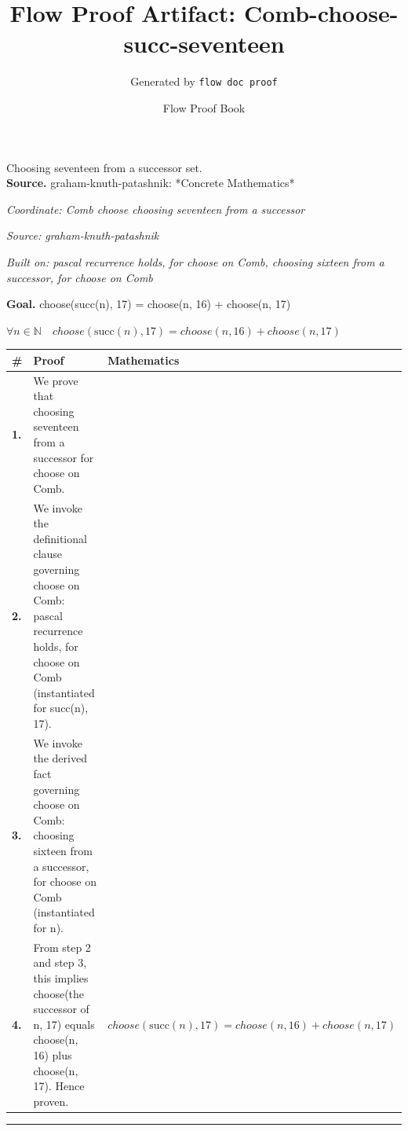\documentclass[11pt]{article}
\title{Flow Proof Artifact: Comb-choose-succ-seventeen}
\author{Generated by \texttt{flow doc proof}}
\date{Flow Proof Book}
\theoremstyle{definition}
\begin{document}
\maketitle
Choosing seventeen from a successor set.\\[0.5em]
\textbf{Source.} graham-knuth-patashnik: *Concrete Mathematics*\\[0.5em]
\bigskip
{}\par
\smallskip\noindent\textit{Coordinate: Comb \cdot choose \cdot choosing seventeen from a successor}\par
\smallskip\noindent\textit{Source: graham-knuth-patashnik}\par
\smallskip\noindent\textit{Built on: pascal recurrence holds, for choose on Comb, choosing sixteen from a successor, for choose on Comb}\par
\medskip
\noindent\textbf{Goal.} choose(succ(n), 17) = choose(n, 16) + choose(n, 17)\par
\noindent$\displaystyle \forall n \in \mathbb{N}\quad choose(\mathrm{succ}(n), 17) = choose(n, 16) + choose(n, 17)$\par
\medskip
\noindent
\begin{tabular}{@{} >{\raggedright\arraybackslash}p{} >{\raggedright\arraybackslash}p{} >{\raggedleft\arraybackslash}p{} @{}}
\textbf{\#} & \textbf{Proof} & \textbf{Mathematics} \\
\midrule
\textbf{1.} & We prove that choosing seventeen from a successor for choose on Comb. & \\[0.45em]
\textbf{2.} & We invoke the definitional clause governing choose on Comb: pascal recurrence holds, for choose on Comb (instantiated for succ(n), 17). & \\[0.45em]
\textbf{3.} & We invoke the derived fact governing choose on Comb: choosing sixteen from a successor, for choose on Comb (instantiated for n). & \\[0.45em]
\textbf{4.} & From step 2 and step 3, this implies choose(the successor of n, 17) equals choose(n, 16) plus choose(n, 17). Hence proven. & $\displaystyle choose(\mathrm{succ}(n), 17) = choose(n, 16) + choose(n, 17)$ \\[0.45em]
\bottomrule
\end{tabular}
\label{thm:Comb-choose-choosing_seventeen_from_a_successor}
\par\medskip\hrule
\end{document}
